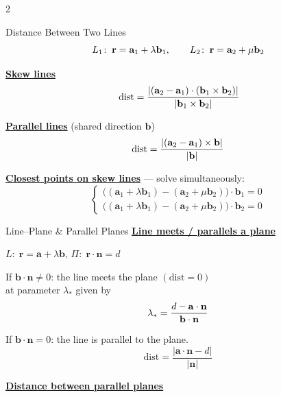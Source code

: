 \documentclass{article}
\newcommand{\modulus}[1]{\left\lvert #1 \right\rvert}
\newcommand{\length}[1]{\left\lvert #1 \right\rvert}
\begin{document}
\begin{multicols}{2}
\begin{goldbox}{Distance Between Two Lines}
\[
  L_1\!:\;\mathbf r=\mathbf a_1+\lambda\mathbf b_1,
  \qquad
  L_2\!:\;\mathbf r=\mathbf a_2+\mu\mathbf b_2 \\[10pt]
\]

\underline{\textbf{Skew lines}}
\[
  \;\mathrm{dist}
  =\frac{\modulus{(\mathbf a_2-\mathbf a_1)
         \cdot(\mathbf b_1\times\mathbf b_2)}}
        {\length{\mathbf b_1\times\mathbf b_2}}\; \\[10pt]
\]

\underline{\textbf{Parallel lines}}\; (shared direction $\mathbf b$)\vspace*{2pt}
\[
  \mathrm{dist}
  =\frac{\length{(\mathbf a_2-\mathbf a_1)\times\mathbf b}}
        {\length{\mathbf b}} \\[10pt]
\]

\underline{\textbf{Closest points on skew lines}} --- solve simultaneously:
\[\begin{cases}
  \bigl((\mathbf a_1+\lambda\mathbf b_1)
       -(\mathbf a_2+\mu\mathbf b_2)\bigr)
  \cdot\mathbf b_1=0\\

  \bigl((\mathbf a_1+\lambda\mathbf b_1)
       -(\mathbf a_2+\mu\mathbf b_2)\bigr)
  \cdot\mathbf b_2=0
\end{cases}\]
\end{goldbox}

\begin{plumbox}{Line--Plane \& Parallel Planes}
\underline{\textbf{Line meets / parallels a plane}} \vspace*{5pt}

$L\!:\;\mathbf r=\mathbf a+\lambda\mathbf b$,\quad
$\Pi\!:\;\mathbf r\cdot\mathbf n=d$

\smallskip
If $\mathbf b\cdot\mathbf n\neq 0$: the line meets the plane
$(\mathrm{dist}=0)$ \\ at parameter $\lambda_*$ given by
\[
  \lambda_*=\frac{d-\mathbf a\cdot\mathbf n}{\mathbf b\cdot\mathbf n} \\[10pt]
\]

If $\mathbf b\cdot\mathbf n=0$: the line is parallel to the plane.
\[
  \mathrm{dist}
  =\frac{\modulus{\mathbf a\cdot\mathbf n-d}}{\length{\mathbf n}}
\]

\medskip
\underline{\textbf{Distance between parallel planes}}
\vspace*{5pt}


\end{plumbox}
\end{multicols}
\end{document}
